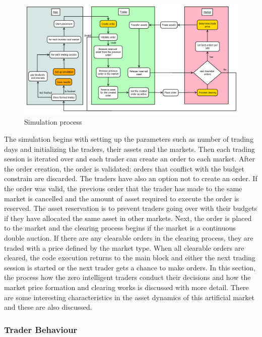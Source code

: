 \begin{figure}
    \includegraphics[width=\linewidth]{diagrams/placement_clearing_process.png}
    \caption{Simulation process}
    \label{fig:sim_proc}
\end{figure}

The simulation begins with setting up the parameters such as number of
trading days and initializing the traders, their assets and the markets.
Then each trading session is iterated over and each trader can create  
an order to each market. After the order creation, the order is validated: 
orders that conflict with the budget constrain are discarded.
The traders have also an option not to create an order. If the order was
valid, the previous order that the trader has made to the same market is cancelled 
and the amount of asset required to execute the order is reserved. The asset
reservation is to prevent traders going over with their budgets if they
have allocated the same asset in other markets. Next, the order is
placed to the market and the clearing process begins if the market is a 
continuous double auction. If there are any clearable orders in the clearing process,
they are traded with a price defined by the market type. When
all clearable orders are cleared, the code execution returns to the
main block and either the next trading session is started or the next
trader gets a chance to make orders. In this section, the process how the
zero intelligent traders conduct their decisions and how the 
market price formation and clearing works is discussed with more detail.
There are some interesting characteristics in the asset dynamics of this
artificial market and these are also discussed.

\subsubsection{Trader Behaviour}

